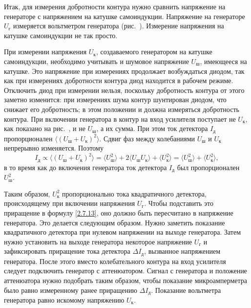 Итак, для измерения добротности контура нужно сравнить напряжение на генераторе
с напряжением на катушке самоиндукции.
Напряжение на генераторе $U_{\text{г}}$ измеряется вольтметром генератора
(рис.~). Измерение напряжения на катушке самоиндукции
не так просто.

При измерении напряжения $U_{\text{к}}$, создаваемого генератором на катушке
самоиндукции, необходимо учитывать и шумовое
напряжение $U_{\text{ш}}$, имеющееся на катушке. Это напряжение при измерениях
продолжает возбуждаться диодом, так как при
измерениях добротности контура диод находится в рабочем режиме. Отключить диод
при измерении нельзя, поскольку
добротность контура от этого заметно изменится: при измерениях шума контур
шунтирован диодом, что снижает его
добротность; в этом положении и должна измеряться добротность контура. При
включении генератора в контур на вход
усилителя поступает не $U_{\text{к}}$, как показано на рис.~, и
не $U_{\text{ш}}$, а их сумма. При этом ток детектора $I_{\text{д}}$
пропорционален
$\langle (U_{\text{ш}}+U_{\text{к}})^2\rangle$. Сдвиг фаз между колебаниями
$U_{\text{ш}}$ и $U_{\text{к}}$ непрерывно изменяется. Поэтому
\begin{equation*}
I_{\text{д}}\propto\langle (U_{\text{ш}}+U_{\text{к}})^2\rangle=\langle
U_{\text{ш}}^2\rangle+2\langle U_{\text{ш}}U_{\text{к}}\rangle+\langle
U_{\text{к}}^2\rangle=\langle U_{\text{ш}}^2\rangle+\langle
U_{\text{к}}^2\rangle,
\end{equation*}
в то время как до включения генератора ток детектора $I_{\text{д}}$ был
пропорционален $U_{\text{ш}}^2$.

Таким образом, $U_{\text{к}}^2$ пропорционально  тока
квадратичного детектора, происходящему при включении
напряжения $U_{\text{г}}$. Чтобы подставить это приращение в формулу
\eqref{2.7.13}, оно должно быть пересчитано в напряжение
генератора. Это делается следующим образом. Нужно заметить показание
квадратичного детектора при нулевом напряжении на
выходе генератора. Затем нужно установить на выходе генератора некоторое
напряжение $U_{\text{г}}$ и зафиксировать приращение
тока детектора $\Delta I_{\text{д}}$, вызванное напряжением генератора. После
этого вместо колебательного контура на вход усилителя
следует подключить генератор с аттенюатором. Сигнал с генератора и положение
аттенюатора нужно подобрать таким образом,
чтобы показание микроамперметра было равно измеренному ранее приращению $\Delta
I_{\text{д}}$. Показание вольтметра генератора равно
искомому напряжению $U_{\text{к}}$.

